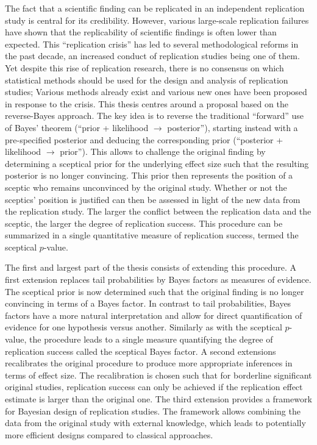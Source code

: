 The fact that a scientific finding can be replicated in an independent
replication study is central for its credibility. However, various large-scale
replication failures have shown that the replicability of scientific findings is
often lower than expected. This ``replication crisis'' has led to several
methodological reforms in the past decade, an increased conduct of replication
studies being one of them. Yet despite this rise of replication research, there
is no consensus on which statistical methods should be used for the design and
analysis of replication studies; Various methods already exist and various new
ones have been proposed in response to the crisis. This thesis centres around a
proposal based on the reverse-Bayes approach. The key idea is to reverse the
traditional ``forward'' use of Bayes' theorem (``prior + likelihood
$\rightarrow$ posterior''), starting instead with a pre-specified posterior and
deducing the corresponding prior (``posterior + likelihood $\rightarrow$
prior''). %
This allows to challenge the original finding by determining a sceptical prior
for the underlying effect size such that the resulting posterior is no longer
convincing. This prior then represents the position of a sceptic who remains
unconvinced by the original study. Whether or not the sceptics' position is
justified can then be assessed in light of the new data from the replication
study. The larger the conflict between the replication data and the sceptic, the
larger the degree of replication success. This procedure can be summarized in a
single quantitative measure of replication success, termed the sceptical
$p$-value.

The first and largest part of the thesis consists of extending this procedure. A
first extension replaces tail probabilities by Bayes factors as measures of
evidence. The sceptical prior is now determined such that the original finding
is no longer convincing in terms of a Bayes factor. In contrast to tail
probabilities, Bayes factors have a more natural interpretation and allow for
direct quantification of evidence for one hypothesis versus another. Similarly
as with the sceptical $p$-value, the procedure leads to a single measure
quantifying the degree of replication success called the sceptical Bayes factor.
A second extensions recalibrates the original procedure to produce more
appropriate inferences in terms of effect size. %
The recalibration is chosen such that for borderline significant original
studies, replication success can only be achieved if the replication effect
estimate is larger than the original one. The third extension provides a
framework for Bayesian design of replication studies. The framework allows
combining the data from the original study with external knowledge, which leads
to potentially more efficient designs compared to classical approaches.

